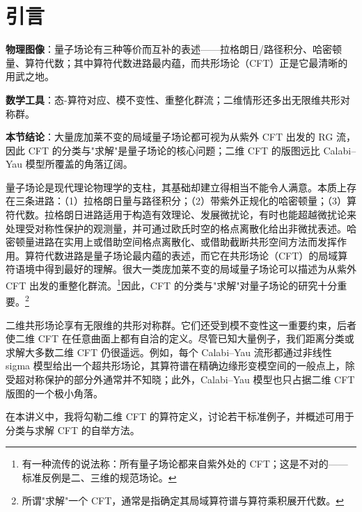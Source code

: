 
\section{引言}\label{sec:1}

\begin{keytakeaways}
  \item \textbf{物理图像}：量子场论有三种等价而互补的表述——拉格朗日/路径积分、哈密顿量、算符代数；其中算符代数进路最内蕴，而共形场论（CFT）正是它最清晰的用武之地。
  \item \textbf{数学工具}：态-算符对应、模不变性、重整化群流；二维情形还多出无限维共形对称群。
  \item \textbf{本节结论}：大量庞加莱不变的局域量子场论都可视为从紫外 CFT 出发的 RG 流，因此 CFT 的分类与"求解"是量子场论的核心问题；二维 CFT 的版图远比 Calabi--Yau 模型所覆盖的角落辽阔。
\end{keytakeaways}

量子场论是现代理论物理学的支柱，其基础却建立得相当不能令人满意。本质上存在三条进路：（1）拉格朗日量与路径积分；（2）带紫外正规化的哈密顿量；（3）算符代数。拉格朗日进路适用于构造有效理论、发展微扰论，有时也能超越微扰论来处理受对称性保护的观测量，并可通过欧氏时空的格点离散化给出非微扰表述。哈密顿量进路在实用上或借助空间格点离散化、或借助截断共形空间方法而发挥作用。算符代数进路是量子场论最内蕴的表述，而它在共形场论（CFT）的局域算符语境中得到最好的理解。很大一类庞加莱不变的局域量子场论可以描述为从紫外 CFT 出发的重整化群流。\footnote{有一种流传的说法称：所有量子场论都来自紫外处的 CFT；这是不对的——标准反例是二、三维的规范场论。}因此，CFT 的分类与"求解"对量子场论的研究十分重要。\footnote{所谓"求解"一个 CFT，通常是指确定其局域算符谱与算符乘积展开代数。}

二维共形场论享有无限维的共形对称群。它们还受到模不变性这一重要约束，后者使二维 CFT 在任意曲面上都有自洽的定义。尽管已知大量例子，我们距离分类或求解大多数二维 CFT 仍很遥远。例如，每个 Calabi--Yau 流形都通过非线性 sigma 模型给出一个超共形场论，其算符谱在精确边缘形变模空间的一般点上，除受超对称保护的部分外通常并不知晓；此外，Calabi--Yau 模型也只占据二维 CFT 版图的一个极小角落。

在本讲义中，我将勾勒二维 CFT 的算符定义，讨论若干标准例子，并概述可用于分类与求解 CFT 的自举方法。

